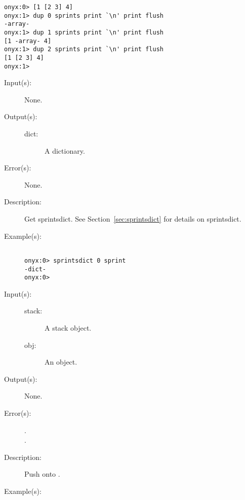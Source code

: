 \begin{description}
\begin{description}
\begin{verbatim}
onyx:0> [1 [2 3] 4]
onyx:1> dup 0 sprints print `\n' print flush
-array-
onyx:1> dup 1 sprints print `\n' print flush
[1 -array- 4]
onyx:1> dup 2 sprints print `\n' print flush
[1 [2 3] 4]
onyx:1>
		\end{verbatim}
	\end{description}
\label{systemdict:sprintsdict}
\item[{\onyxop{--}{sprintsdict}{dict}}: ]
	\begin{description}\item[]
	\item[Input(s): ] None.
	\item[Output(s): ]
		\begin{description}\item[]
		\item[dict: ]
			A dictionary.
		\end{description}
	\item[Error(s): ] None.
	\item[Description: ]
		Get sprintsdict.  See Section~\ref{sec:sprintsdict} for details
		on sprintsdict.
	\item[Example(s): ]\begin{verbatim}

onyx:0> sprintsdict 0 sprint
-dict-
onyx:0>
		\end{verbatim}
	\end{description}
\label{systemdict:spush}
\item[{\onyxop{stack obj}{spush}{--}}: ]
	\begin{description}\item[]
	\item[Input(s): ]
		\begin{description}\item[]
		\item[stack: ]
			A stack object.
		\item[obj: ]
			An object.
		\end{description}
	\item[Output(s): ] None.
	\item[Error(s): ]
		\begin{description}\item[]
		\item[.]
		\item[.]
		\end{description}
	\item[Description: ]
		Push  onto .
	\item[Example(s): ]\begin{verbatim}


\end{verbatim}
\end{description}
\end{description}
